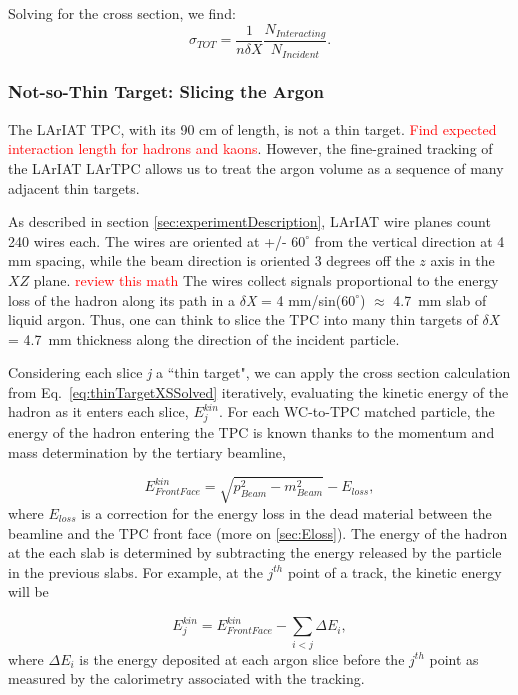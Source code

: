{Solving for the cross section, we find:
\begin{equation}
 \sigma_{TOT}  = \frac{1}{n \delta X}\frac{N_{Interacting}}{N_{Incident}}.
\label{eq:thinTargetXSSolved}
\end{equation}

\subsubsection{Not-so-Thin Target: Slicing the Argon}
The LArIAT TPC, with its 90 cm of length, is not a thin target. \textcolor{red}{Find expected interaction length for hadrons and kaons}. However, the fine-grained tracking of the LArIAT LArTPC allows us to treat the argon volume as a sequence of many adjacent thin targets. 

As described in section \ref{sec:experimentDescription}, LArIAT wire planes count 240 wires each. The wires are oriented at +/- $60^{\circ}$ from the vertical direction at 4 mm spacing, while the beam direction is oriented 3 degrees off the $z$ axis in the $XZ$ plane. \textcolor{red}{review this math} The wires collect signals proportional to the energy loss of the hadron along its path in a  $\delta${\emph{X}} = 4 mm/sin($60^{\circ}$) $\approx$ 4.7~mm slab of liquid argon. Thus, one can think to slice the TPC into many thin targets of $\delta${\emph{X}} = 4.7~mm thickness along the direction of the incident particle. 

Considering each slice {\emph{j}}  a ``thin target",  we can apply the cross section calculation from Eq.~\ref{eq:thinTargetXSSolved} iteratively, evaluating the kinetic energy of the hadron as it enters each slice, $E_{j}^{kin}$.  For each WC-to-TPC matched particle, the energy of the hadron entering the TPC is known thanks to the momentum and mass determination by the tertiary beamline, 

\begin{equation}
 E^{kin}_{Front Face}  = \sqrt{p^2_{Beam} - m^2_{Beam}} - E_{loss},
\label{eq:enFF}
\end{equation}
where $E_{loss}$ is a correction for the energy loss in the dead material between the beamline and the TPC front face (more on \ref{sec:Eloss}). The  energy of the hadron at the each slab is determined by subtracting the energy released by the particle in the previous slabs. For example, at the $j^{th}$ point of a track, the kinetic energy will be

\begin{equation}
 E_{j}^{kin} =  E^{kin}_{Front Face} - \sum_{i < j} \Delta E_i,
\label{eq:KEj}
\end{equation}
where $\Delta E_i$ is the energy deposited at each argon slice before the $j^{th}$ point as measured by the calorimetry associated with the tracking.


}
